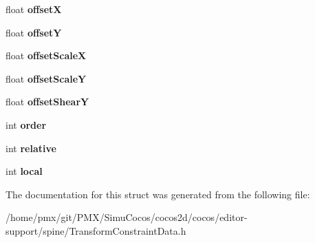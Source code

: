 \begin{DoxyCompactItemize}
$$float {\bfseries offsetX}
\item 
\mbox{\label{structspTransformConstraintData_ae6a807564f0b3dcece6a4ae6945b5b95}} 
float {\bfseries offsetY}
\item 
\mbox{\label{structspTransformConstraintData_a341caed663cf0e828fdf1731706c0af0}} 
float {\bfseries offset\+ScaleX}
\item 
\mbox{\label{structspTransformConstraintData_a29eb4c707eaf461b9513c0f13ae6f71b}} 
float {\bfseries offset\+ScaleY}
\item 
\mbox{\label{structspTransformConstraintData_ab0245b01904a3cf9d2e65b92643a8e1b}} 
float {\bfseries offset\+ShearY}
\item 
\mbox{\label{structspTransformConstraintData_ad15d3789be9f577b782ed7e96504a1a4}} 
int {\bfseries order}
\item 
\mbox{\label{structspTransformConstraintData_ab514e41900642bead129134e91ec915a}} 
int {\bfseries relative}
\item 
\mbox{\label{structspTransformConstraintData_a459218db4d433829ae63f182ad8139ae}} 
int {\bfseries local}
\end{DoxyCompactItemize}


The documentation for this struct was generated from the following file\+:\begin{DoxyCompactItemize}
\item 
/home/pmx/git/\+P\+M\+X/\+Simu\+Cocos/cocos2d/cocos/editor-\/support/spine/Transform\+Constraint\+Data.\+h\end{DoxyCompactItemize}
